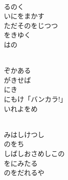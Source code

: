\documentclass[10pt,b5j]{tarticle} %
\begin{document}
\vspace{1.5em} %
\newcommand{\linespace}{0.5em} %
\newcommand{\blocksize}{0.5\hsize} %
\newcommand{\itemmargin}{6em} %
\begin{enumerate} %
    \setlength{\itemindent}{\itemmargin} %
    \begin{minipage}[c]{\blocksize}
    
        \vspace{\linespace}
        \item~\\
        るのく\\
        いにをまかす\\
        ただそのをじつつ\\
        をきゆく\\
        はの
        
        \vspace{\linespace}
        \item~\\
        ぞかある\\
        がきせば\\
        にき\\
        にもけ「バンカラ!」\\
        いれよをめ
        
        \vspace{\linespace}
        \item~\\
        みはしけつし\\
        のをち\\
        しばしおさめしこの\\
        をにみたる\\
        のをだれるや
    
    \end{minipage}
\end{enumerate} %
\end{document}
